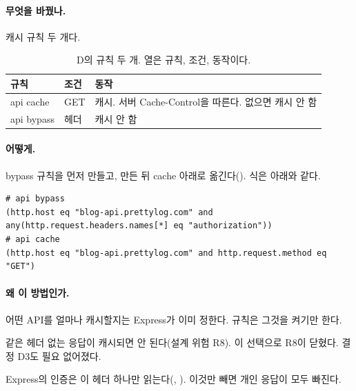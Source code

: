 \paragraph{무엇을 바꿨나.}
캐시 규칙 두 개다.

\begin{table}[H]
  \caption{D의 규칙 두 개. 열은 규칙, 조건, 동작이다.}
  \label{tab:rt-d-rules}
  \centering\small
  \begin{tabularx}{\linewidth}{@{}L{2.3cm}L{4.2cm}Y@{}}
    \toprule
    규칙 & 조건 & 동작 \\
    \midrule
    api cache &  GET & 캐시. 서버 Cache-Control을 따른다. 없으면 캐시 안 함 \\
    \midrule
    api bypass &  헤더 & 캐시 안 함 \\
    \bottomrule
  \end{tabularx}
\end{table}

\paragraph{어떻게.}
bypass 규칙을 먼저 만들고, 만든 뒤 cache 아래로 옮긴다().
식은 아래와 같다.

\begin{lstlisting}[language={}]
# api bypass
(http.host eq "blog-api.prettylog.com" and any(http.request.headers.names[*] eq "authorization"))
# api cache
(http.host eq "blog-api.prettylog.com" and http.request.method eq "GET")
\end{lstlisting}

\paragraph{왜 이 방법인가.}
\begin{description}[font=\bfseries]
  \item[서버 헤더를 따른다] 어떤 API를 얼마나 캐시할지는 Express가 이미 정한다. 규칙은 그것을 켜기만 한다.
  \item[``없으면 캐시 안 함'']  같은 헤더 없는 응답이 캐시되면 안 된다(설계 위험 R8). 이 선택으로 R8이 닫혔다. 결정 D3도 필요 없어졌다.
  \item[\texttt{Authorization}으로 뺀다] Express의 인증은 이 헤더 하나만 읽는다(, ). 이것만 빼면 개인 응답이 모두 빠진다.
\end{description}


